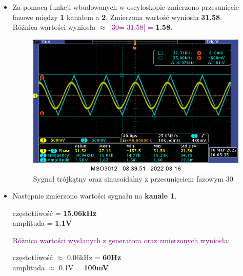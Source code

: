 \begin{itemize}
    \item Za pomocą funkcji wbudowanych w oscyloskopie zmierzono przesunięcie fazowe między \textbf{1} kanałem a \textbf{2}. Zmierzona wartość wyniosła \textbf{31.58}\boldsymbol{\degree}.\\
    \label{ad:roznica_2_4}
    Różnica wartości wyniosła $\approx$ \textcolor{purple}{|30\degree = 31.58\degree| = } \textbf{1.58}\boldsymbol{\degree}.
    
    \begin{figure}[h]
        \centering
        \includegraphics[scale = 0.3]{images/1_4_smaller.png}
        \caption{Sygnał trójkątny oraz sinusoidalny z przesunięciem fazowym 30\degree}
        \label{fig:trójkat_sinus}
    \end{figure}
    
    \item Następnie zmierzono wartości sygnału na \textbf{kanale 1}.
    \begin{center}
        częstotliwość = \textbf{15.06kHz} \\
        amplituda = \textbf{1.1V}
    \end{center}
    \textcolor{purple}{Różnica wartości wysłanych z generatora oraz zmierzonych wyniosła}:
    \begin{center}
        częstotliwość $\approx$ 0.06kHz = \textbf{60Hz} \\
        amplituda $\approx$ 0.1V = \textbf{100mV}
    \end{center}
    

\end{itemize}
